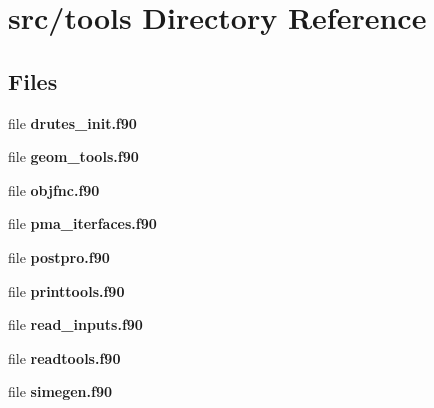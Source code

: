 \section{src/tools Directory Reference}
\label{dir_1563a38af0d3a5e4a6330d6d45e9792a}
\subsection*{Files}
\begin{DoxyCompactItemize}
\item 
file {\bf drutes\+\_\+init.\+f90}
\item 
file {\bf geom\+\_\+tools.\+f90}
\item 
file {\bf objfnc.\+f90}
\item 
file {\bf pma\+\_\+iterfaces.\+f90}
\item 
file {\bf postpro.\+f90}
\item 
file {\bf printtools.\+f90}
\item 
file {\bf read\+\_\+inputs.\+f90}
\item 
file {\bf readtools.\+f90}
\item 
file {\bf simegen.\+f90}
\end{DoxyCompactItemize}
